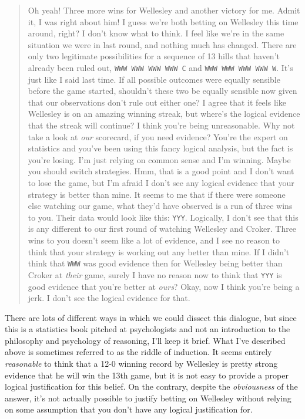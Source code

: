 \begin{quote}
\begin{dialogue}
 Oh yeah! Three more wins for Wellesley and another victory for me. Admit it, I was right about him! I guess we're both betting on Wellesley this time around, right?
 I don't know what to think. I feel like we're in the same situation we were in last round, and nothing much has changed. There are only two legitimate possibilities for a sequence of 13 hills that haven't already been ruled out, \texttt{WWW WWW WWW WWW C} and \texttt{WWW WWW WWW WWW W}. It's just like I said last time. If all possible outcomes were equally sensible before the game started, shouldn't these two be equally sensible now given that our observations don't rule out either one? I agree that it feels like Wellesley is on an amazing winning streak, but where's the logical evidence that the streak will continue?
 I think you're being unreasonable. Why not take a look at {\it our} scorecard, if you need evidence? You're the expert on statistics and you've been using this fancy logical analysis, but the fact is you're losing. I'm just relying on common sense and I'm winning. Maybe you should switch strategies.
 Hmm, that is a good point and I don't want to lose the game, but I'm afraid I don't see any logical evidence that your strategy is better than mine. It seems to me that if there were someone else watching our game, what they'd have observed is a run of three wins to you. Their data would look like this: \texttt{YYY}. Logically, I don't see that this is any different to our first round of watching Wellesley and Croker. Three wins to you doesn't seem like a lot of evidence, and I see no reason to think that your strategy is working out any better than mine. If I didn't think that \texttt{WWW} was good evidence then for Wellesley being better than Croker at {\it their} game, surely I have no reason now to think that \texttt{YYY} is good evidence that you're better at {\it ours}?
 Okay, now I think you're being a jerk.
 I don't see the logical evidence for that.
\end{dialogue}
\end{quote}


There are lots of different ways in which we could dissect this dialogue, but since this is a statistics book pitched at psychologists and not an introduction to the philosophy and psychology of reasoning, I'll keep it brief. What I've described above is sometimes referred to as the riddle of induction. It seems entirely {\it reasonable} to think that a 12-0 winning record by Wellesley is pretty strong evidence that he will win the 13th game, but it is not easy to provide a proper logical justification for this belief. On the contrary, despite the {\it obviousness} of the answer, it's not actually possible to justify betting on Wellesley without relying on some assumption that you don't have any logical justification for. 

